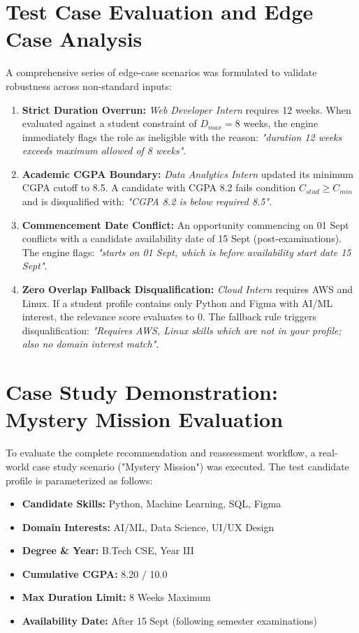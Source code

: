 \section{Test Case Evaluation and Edge Case Analysis} \label{S6.3}
A comprehensive series of edge-case scenarios was formulated to validate robustness across non-standard inputs:

\begin{enumerate}[label=\textbf{Case \arabic*:}]
	\item \textbf{Strict Duration Overrun:} \textit{Web Developer Intern} requires 12 weeks. When evaluated against a student constraint of $D_{max} = 8$ weeks, the engine immediately flags the role as ineligible with the reason: \textit{"duration 12 weeks exceeds maximum allowed of 8 weeks"}.
	\item \textbf{Academic CGPA Boundary:} \textit{Data Analytics Intern} updated its minimum CGPA cutoff to 8.5. A candidate with CGPA 8.2 fails condition $C_{stud} \ge C_{min}$ and is disqualified with: \textit{"CGPA 8.2 is below required 8.5"}.
	\item \textbf{Commencement Date Conflict:} An opportunity commencing on 01 Sept conflicts with a candidate availability date of 15 Sept (post-examinations). The engine flags: \textit{"starts on 01 Sept, which is before availability start date 15 Sept"}.
	\item \textbf{Zero Overlap Fallback Disqualification:} \textit{Cloud Intern} requires AWS and Linux. If a student profile contains only Python and Figma with AI/ML interest, the relevance score evaluates to 0. The fallback rule triggers disqualification: \textit{"Requires AWS, Linux skills which are not in your profile; also no domain interest match"}.
\end{enumerate}

\section{Case Study Demonstration: Mystery Mission Evaluation} \label{S6.4}
To evaluate the complete recommendation and reassessment workflow, a real-world case study scenario ("Mystery Mission") was executed. The test candidate profile is parameterized as follows:
\begin{itemize}
	\item \textbf{Candidate Skills:} Python, Machine Learning, SQL, Figma
	\item \textbf{Domain Interests:} AI/ML, Data Science, UI/UX Design
	\item \textbf{Degree \& Year:} B.Tech CSE, Year III
	\item \textbf{Cumulative CGPA:} 8.20 / 10.0
	\item \textbf{Max Duration Limit:} 8 Weeks Maximum
	\item \textbf{Availability Date:} After 15 Sept (following semester examinations)
\end{itemize}

